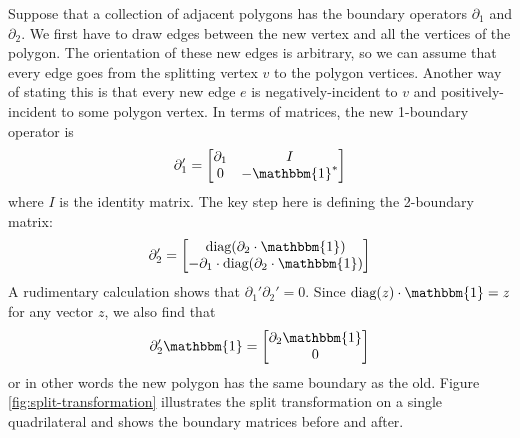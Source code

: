 \documentclass[twocolumn]{article}
\begin{document}
Suppose that a collection of adjacent polygons has the boundary operators $\partial_1$ and $\partial_2$.
We first have to draw edges between the new vertex and all the vertices of the polygon.
The orientation of these new edges is arbitrary, so we can assume that every edge goes from the splitting vertex $v$ to the polygon vertices.
Another way of stating this is that every new edge $e$ is negatively-incident to $v$ and positively-incident to some polygon vertex.
In terms of matrices, the new 1-boundary operator is
\begin{equation}
    \partial_1' = \left[\begin{matrix}\partial_1 & I \\ 0 & -\mathbbm{1}^*\end{matrix}\right]
    \label{eq:split-1-2d}
\end{equation}
where $I$ is the identity matrix.
The key step here is defining the 2-boundary matrix:
\begin{equation}
    \partial_2' = \left[\begin{matrix}\text{diag}(\partial_2\cdot\mathbbm{1}) \\ -\partial_1\cdot\text{diag}(\partial_2\cdot\mathbbm{1})\end{matrix}\right]
\end{equation}
A rudimentary calculation shows that $\partial_1'\partial_2' = 0$.
Since $\text{diag}(z)\cdot\mathbbm{1} = z$ for any vector $z$, we also find that
\begin{equation}
    \partial_2'\mathbbm{1} = \left[\begin{matrix}\partial_2\mathbbm{1} \\ 0\end{matrix}\right]
\end{equation}
or in other words the new polygon has the same boundary as the old.
Figure \ref{fig:split-transformation} illustrates the split transformation on a single quadrilateral and shows the boundary matrices before and after.
\end{document}
